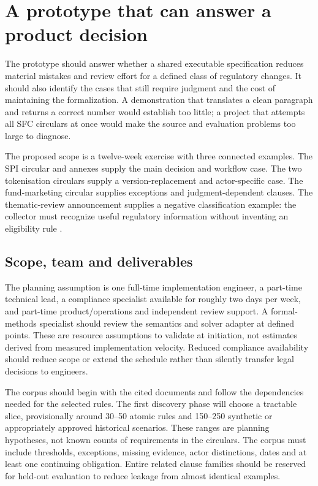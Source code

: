 \section{A prototype that can answer a product decision}
\label{sec:prototype}

The prototype should answer whether a shared executable specification reduces
material mistakes and review effort for a defined class of regulatory changes.
It should also identify the cases that still require judgment and the cost of
maintaining the formalization. A demonstration that translates a clean paragraph
and returns a correct number would establish too little; a project that attempts
all SFC circulars at once would make the source and evaluation problems too large
to diagnose.

The proposed scope is a twelve-week exercise with three connected examples. The
SPI circular and annexes supply the main decision and workflow case. The two
tokenisation circulars supply a version-replacement and actor-specific case.
The fund-marketing circular supplies exceptions and judgment-dependent clauses.
The thematic-review announcement supplies a negative classification example:
the collector must recognize useful regulatory information without inventing an
eligibility rule \citep{sfcspi,sfctoken2023,sfctoken2026,sfcmarketing,sfcreview2025}.

\subsection{Scope, team and deliverables}

The planning assumption is one full-time implementation engineer, a part-time
technical lead, a compliance specialist available for roughly two days per week, and
part-time product/operations and independent review support. A formal-methods
specialist should review the semantics and solver adapter at defined points.
These are resource assumptions to validate at initiation, not estimates derived
from measured implementation velocity. Reduced compliance availability should
reduce scope or extend the schedule rather than silently transfer legal decisions
to engineers.

The corpus should begin with the cited documents and follow the dependencies
needed for the selected rules. The first discovery phase will choose a tractable
slice, provisionally around 30--50 atomic rules and 150--250 synthetic or
appropriately approved historical scenarios. These ranges are planning hypotheses,
not known counts of requirements in the circulars. The corpus must include
thresholds, exceptions, missing evidence, actor distinctions, dates and at least
one continuing obligation. Entire related clause families should be reserved for
held-out evaluation to reduce leakage from almost identical examples.

